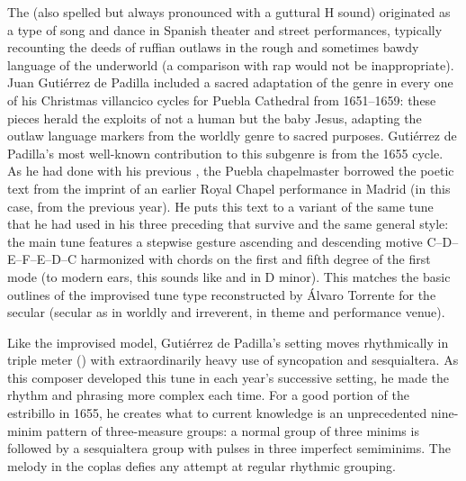 The  (also spelled  but always pronounced with a
guttural H sound) originated as a type of song and dance in Spanish theater and
street performances, typically recounting the deeds of ruffian outlaws in the
rough and sometimes bawdy language of the underworld (a comparison with rap
would not be inappropriate).%
    \Autocites{Torrente:Jacara}{XXX}
Juan Gutiérrez de Padilla included a sacred adaptation of the genre in every
one \XXX[check] of his Christmas villancico cycles for Puebla Cathedral from
1651--1659: these pieces herald the exploits of not a human  but
the baby Jesus, adapting the outlaw language markers from the worldly genre to
sacred purposes.
Gutiérrez de Padilla's most well-known contribution to this subgenre is
 from the 1655 cycle.
As he had done with his previous , the Puebla chapelmaster
borrowed the poetic text from the imprint of an earlier Royal Chapel
performance in Madrid (in this case, from the previous year).%
He puts this text to a variant of the same tune that he had used in his three 
preceding  that survive and the same general style: the main tune
features a stepwise gesture ascending and descending motive
C\sh--D--E--F--E--D--C\sh{} harmonized with  chords on the first
and fifth degree of the first mode (to modern ears, this sounds like 
and  in D minor).
This matches the basic outlines of the improvised tune type reconstructed by
Álvaro Torrente for the secular  (secular as in worldly and
irreverent, in theme and performance venue).

Like the improvised model, Gutiérrez de Padilla's setting moves rhythmically in
triple meter (\meterCZ) with extraordinarily heavy use of syncopation and
sesquialtera.
As this composer developed this tune in each year's successive setting, he made
the rhythm and phrasing more complex each time.
For a good portion of the estribillo in 1655, he creates what to current
knowledge is an unprecedented nine-minim pattern of three-measure groups: a
normal group of three minims is followed by a sesquialtera group with pulses in
three imperfect semiminims.
The melody in the coplas defies any attempt at regular rhythmic grouping. 


